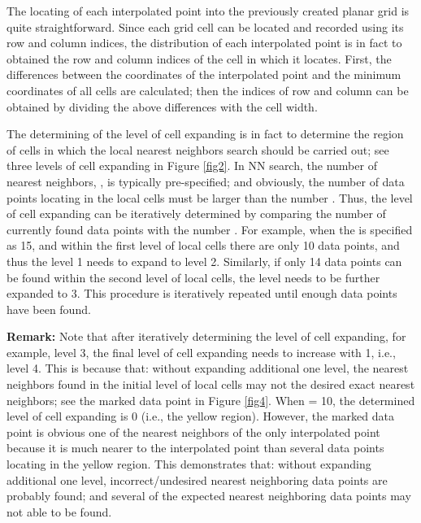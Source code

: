 \documentclass[final,5p,times,twocolumn,authoryear]{elsarticle}
\begin{document}
			The locating of each interpolated point into the previously created planar 
			grid is quite straightforward. Since each grid cell can be located and 
			recorded using its row and column indices, the distribution of each 
			interpolated point is in fact to obtained the row and column indices of the 
			cell in which it locates. First, the differences between the coordinates of 
			the interpolated point and the minimum coordinates of all cells are 
			calculated; then the indices of row and column can be obtained by dividing 
			the above differences with the cell width.
			
			The determining of the level of cell expanding is in fact to determine the 
			region of cells in which the local nearest neighbors search should be 
			carried out; see three levels of cell expanding in Figure \ref{fig2}. In NN search, 
			the number of nearest neighbors, , is typically pre-specified; and 
			obviously, the number of data points locating in the local cells must be 
			larger than the number . Thus, the level of cell expanding can be 
			iteratively determined by comparing the number of currently found data 
			points with the number . For example, when the  is specified as 15, and 
			within the first level of local cells there are only 10 data points, and 
			thus the level 1 needs to expand to level 2. Similarly, if only 14 data 
			points can be found within the second level of local cells, the level needs 
			to be further expanded to 3. This procedure is iteratively repeated until 
			enough data points have been found.
			
			\textbf{Remark:} Note that after iteratively determining the level of cell 
			expanding, for example, level 3, the final level of cell expanding needs to 
			increase with 1, i.e., level 4. This is because that: without expanding 
			additional one level, the nearest neighbors found in the initial level of 
			local cells may not the desired exact  nearest neighbors; see the marked 
			data point in Figure \ref{fig4}. When  = 10, the determined level of cell expanding 
			is 0 (i.e., the yellow region). However, the marked data point is obvious 
			one of the nearest neighbors of the only interpolated point because it is 
			much nearer to the interpolated point than several data points locating in 
			the yellow region. This demonstrates that: without expanding additional one 
			level, incorrect/undesired nearest neighboring data points are probably 
			found; and several of the expected nearest neighboring data points may not able to be found.
			
\end{document}
